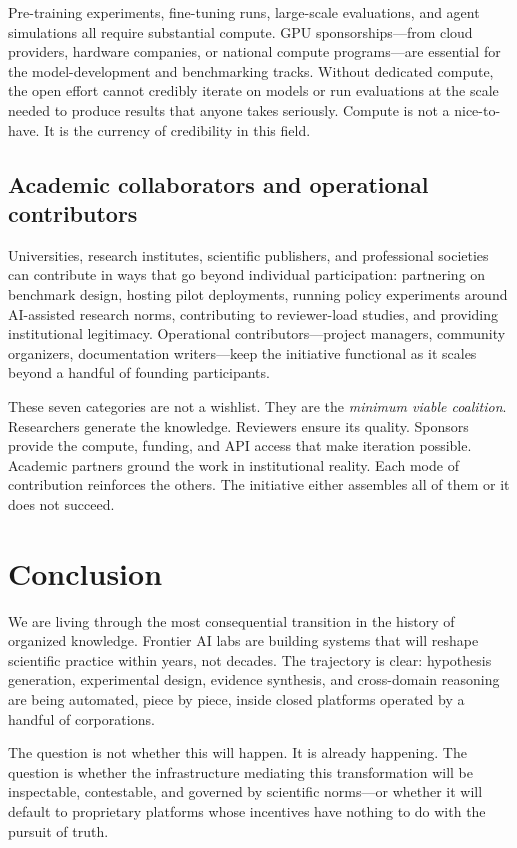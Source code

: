 \documentclass[11pt]{article}
\begin{document}
Pre-training experiments, fine-tuning runs, large-scale evaluations, and agent simulations all require substantial compute. GPU sponsorships---from cloud providers, hardware companies, or national compute programs---are essential for the model-development and benchmarking tracks. Without dedicated compute, the open effort cannot credibly iterate on models or run evaluations at the scale needed to produce results that anyone takes seriously. Compute is not a nice-to-have. It is the currency of credibility in this field.

\subsection{Academic collaborators and operational contributors}

Universities, research institutes, scientific publishers, and professional societies can contribute in ways that go beyond individual participation: partnering on benchmark design, hosting pilot deployments, running policy experiments around AI-assisted research norms, contributing to reviewer-load studies, and providing institutional legitimacy. Operational contributors---project managers, community organizers, documentation writers---keep the initiative functional as it scales beyond a handful of founding participants.

\medskip

These seven categories are not a wishlist. They are the \emph{minimum viable coalition}. Researchers generate the knowledge. Reviewers ensure its quality. Sponsors provide the compute, funding, and API access that make iteration possible. Academic partners ground the work in institutional reality. Each mode of contribution reinforces the others. The initiative either assembles all of them or it does not succeed.

\section{Conclusion}

We are living through the most consequential transition in the history of organized knowledge. Frontier AI labs are building systems that will reshape scientific practice within years, not decades. The trajectory is clear: hypothesis generation, experimental design, evidence synthesis, and cross-domain reasoning are being automated, piece by piece, inside closed platforms operated by a handful of corporations.

The question is not whether this will happen. It is already happening. The question is whether the infrastructure mediating this transformation will be inspectable, contestable, and governed by scientific norms---or whether it will default to proprietary platforms whose incentives have nothing to do with the pursuit of truth.
\end{document}
